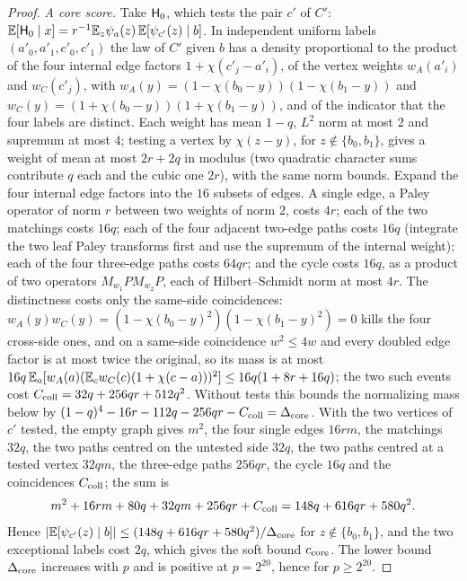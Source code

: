 \begin{proof}
\emph{A core score.} Take $\mathsf H_{0}$, which tests the pair $c'$ of $C'$:
$\mathbb E[\mathsf H_{0}\mid x]=r^{-1}\mathbb E_z\psi_a(z)\,\mathbb E[\psi_{c'}(z)\mid b]$. In independent uniform labels
$(a'_0,a'_1,c'_0,c'_1)$ the law of $C'$ given $b$ has a density proportional to the
product of the four internal edge factors $1+\chi(c'_j-a'_i)$, of the vertex weights
$w_A(a'_i)$ and $w_C(c'_j)$, with $w_A(y)=(1-\chi(b_0-y))(1-\chi(b_1-y))$ and
$w_C(y)=(1+\chi(b_0-y))(1+\chi(b_1-y))$, and of the indicator that the four labels are
distinct. Each weight has mean $1-q$, $L^2$ norm at most $2$ and supremum at most $4$;
testing a vertex by $\chi(z-y)$, for $z\notin\{b_0,b_1\}$, gives a weight of mean at most
$2r+2q$ in modulus (two quadratic character sums
contribute $q$ each and the cubic one $2r$),
with the same norm bounds. Expand the four internal edge factors into the $16$ subsets of
edges. A single edge, a Paley operator of norm $r$ between two weights of norm $2$, costs
$4r$; each of the two matchings costs $16q$; each of the four adjacent two-edge paths
costs $16q$ (integrate the two leaf Paley transforms first and use the supremum of the
internal weight); each of the four three-edge paths costs $64qr$; and the cycle costs
$16q$, as a product of two operators $M_{w_1}PM_{w_2}P$, each of Hilbert--Schmidt norm at
most $4r$. The distinctness costs only the same-side coincidences:
$w_A(y)w_C(y)=(1-\chi(b_0-y)^2)(1-\chi(b_1-y)^2)=0$ kills the four cross-side ones, and on a
same-side coincidence $w^2\le4w$ and every doubled edge factor is at most twice the
original, so its mass is at most
$16q\,\mathbb E_a[w_A(a)(\mathbb E_cw_C(c)(1+\chi(c-a)))^2]\le16q(1+8r+16q)$; the two such events cost
$C_{\rm coll}=32q+256qr+512q^2$. Without tests this bounds the normalizing mass below by
$(1-q)^4-16r-112q-256qr-C_{\rm coll}=\Delta_{\rm core}$. With the two vertices of $c'$
tested, the empty graph gives $m^2$, the four single edges $16rm$, the matchings $32q$, the
two paths centred on the untested side $32q$, the two paths centred at a tested vertex
$32qm$, the three-edge paths $256qr$, the cycle $16q$ and the coincidences $C_{\rm coll}$; the
sum is
\[
 m^2+16rm+80q+32qm+256qr+C_{\rm coll}=148q+616qr+580q^2 .
\]
Hence $|\mathbb E[\psi_{c'}(z)\mid b]|\le(148q+616qr+580q^2)/\Delta_{\rm core}$ for
$z\notin\{b_0,b_1\}$, and the two exceptional labels cost $2q$, which gives the soft bound
$c_{\rm core}$. The lower bound $\Delta_{\rm core}$ increases with $p$ and is positive at
$p=2^{20}$, hence for $p\ge2^{20}$.


\end{proof}
